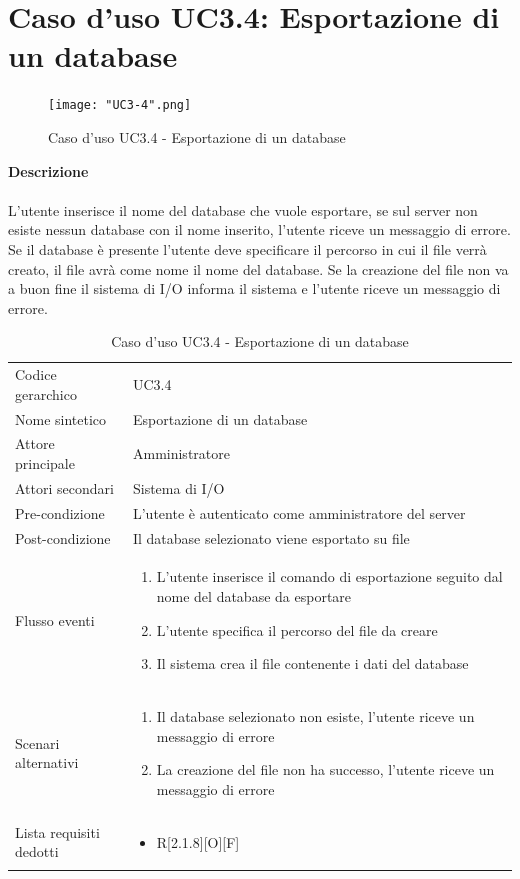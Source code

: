 \documentclass[a4paper]{report}
\begin{document}
	 \section{Caso d'uso UC3.4: Esportazione di un database}
	 	\begin{figure}[H]
			\centering
			\texttt{[image: "UC3-4".png]}
			\caption{Caso d'uso UC3.4 - Esportazione di un database}
		\end{figure}
	 \textbf{Descrizione} \\ \\
	 L'utente inserisce il nome del database che vuole esportare, se sul server non esiste nessun database 
	 con il nome inserito, l'utente riceve un messaggio di errore. \\
	 Se il database è presente l'utente deve specificare il percorso in cui il file verrà creato, il file avrà come
	 nome il nome del database. Se la creazione del file non va a buon fine il sistema di I/O informa il 
	 sistema e l'utente riceve un messaggio di errore.
		\begin{table}[H]
		\begin{tabularx}{\textwidth}{X | X}\toprule
			\rowcolor{orange!65}Codice gerarchico & UC3.4 \\
			Nome sintetico & Esportazione di un database \\
			\rowcolor{orange!65}Attore principale & Amministratore\\
			Attori secondari & Sistema di I/O \\
			\rowcolor{orange!65}Pre-condizione & L'utente è autenticato come amministratore del server\\
			Post-condizione & Il database selezionato viene esportato su file \\
			\rowcolor{orange!65}Flusso eventi & \begin{enumerate}
			\item L'utente inserisce il comando di esportazione seguito dal nome del database da esportare
			\item L'utente specifica il percorso del file da creare
			\item Il sistema crea il file contenente i dati del database
			\end{enumerate} \\
			Scenari alternativi & \begin{enumerate}
			\item Il database selezionato non esiste, l'utente riceve un messaggio di errore
			\item La creazione del file non ha successo, l'utente riceve un messaggio di errore
			\end{enumerate} \\
			\rowcolor{orange!65}Lista requisiti dedotti & \begin{itemize}
			\item R[2.1.8][O][F]
			\end{itemize} \\
			\bottomrule
		\end{tabularx}
		\caption{Caso d'uso UC3.4 - Esportazione di un database}
	 \end{table}
\end{document}
